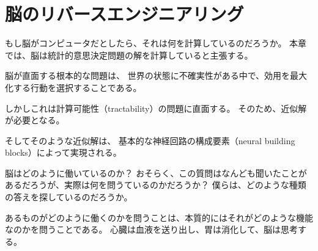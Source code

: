 \chapter{脳のリバースエンジニアリング}
もし脳がコンピュータだとしたら、それは何を計算しているのだろうか。
本章では、脳は統計的意思決定問題の解を計算していると主張する。

脳が直面する根本的な問題は、
世界の状態に不確実性がある中で、効用を最大化する行動を選択することである。

しかしこれは計算可能性（tractability）の問題に直面する。
そのため、近似解が必要となる。

そしてそのような近似解は、
基本的な神経回路の構成要素（neural building blocks）によって実現される。

脳はどのように働いているのか？
おそらく、この質問はなんども聞いたことがあるだろうが、実際は何を問うているのかだろうか？
僕らは、どのような種類の答えを探しているのだろうか。

あるものがどのように働くのかを問うことは、本質的にはそれがどのような機能なのかを問うことである。
心臓は血液を送り出し、胃は消化して、脳は思考する。

\subsection{}


